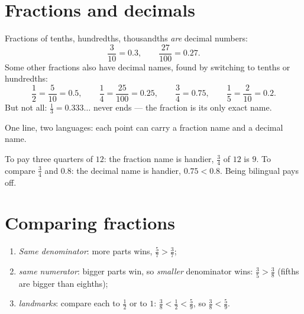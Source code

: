 \section{Fractions and decimals}

\begin{proposition}\label{prop:g5:fractions:decimal}
Fractions of tenths, hundredths, thousandths \emph{are} decimal
numbers:
\[
\frac{3}{10} = 0.3, \qquad \frac{27}{100} = 0.27 .
\]
Some other fractions also have decimal names, found by switching to
tenths or hundredths:
\[
\frac{1}{2} = \frac{5}{10} = 0.5, \qquad
\frac{1}{4} = \frac{25}{100} = 0.25, \qquad
\frac{3}{4} = 0.75, \qquad
\frac{1}{5} = \frac{2}{10} = 0.2 .
\]
But not all: $\frac13 = 0.333\dots$ never ends --- the fraction is
its only exact name.
\end{proposition}
\admitted

\begin{omfigure}

{\small One line, two languages: each point can carry a fraction name
and a decimal name.}
\end{omfigure}

\begin{example}\label{ex:g5:fractions:choose}
To pay three quarters of $12$: the fraction name is handier,
$\frac34$ of $12$ is $9$. To compare $\frac34$ and $0.8$: the
decimal name is handier, $0.75 < 0.8$. Being bilingual pays off.
\end{example}

\section{Comparing fractions}

\begin{method}\label{met:g5:fractions:compare}
\begin{enumerate}
  \item \emph{Same denominator}: more parts wins,
        $\frac57 > \frac37$;
  \item \emph{same numerator}: bigger parts win, so \emph{smaller}
        denominator wins: $\frac35 > \frac38$ (fifths are bigger
        than eighths);
  \item \emph{landmarks}: compare each to $\frac12$ or to $1$:
        $\frac38 < \frac12 < \frac59$, so $\frac38 < \frac59$.
\end{enumerate}
\end{method}

